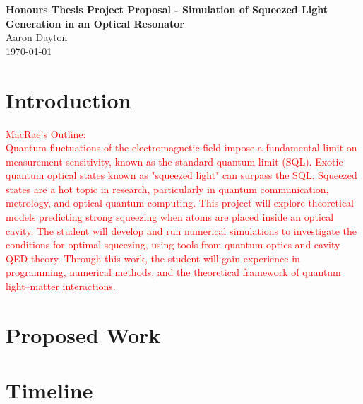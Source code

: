 \documentclass[aps,pra,showpacs,amsmath,amssymb,nofootinbib,longbibliography,superscriptaddress
]{revtex4-1}
\theoremstyle{definition}
\theoremstyle{remark}
\newcommand{\0}{\hat{0}}
\begin{document}



\begin{center}
    \textbf{\Huge Honours Thesis Project Proposal - Simulation of Squeezed Light Generation in an Optical Resonator} \\ %
    \vspace{0.5cm} %
    \Large Aaron Dayton \\ %
    \vspace{0.3cm} %
    \today \\ %
\end{center}

\tableofcontents


\section{Introduction}

\textcolor{red}{
    MacRae's Outline:\\
    Quantum fluctuations of the electromagnetic field impose a fundamental limit on measurement sensitivity, known as the standard quantum limit (SQL). Exotic quantum optical states known as "squeezed light" can surpass the SQL. Squeezed states are a hot topic in research, particularly in quantum communication, metrology, and optical quantum computing. This project will explore theoretical models predicting strong squeezing when atoms are placed inside an optical cavity. The student will develop and run numerical simulations to investigate the conditions for optimal squeezing, using tools from quantum optics and cavity QED theory. Through this work, the student will gain experience in programming, numerical methods, and the theoretical framework of quantum light–matter interactions.
}

\section{Proposed Work}

\section{Timeline}
\end{document}
